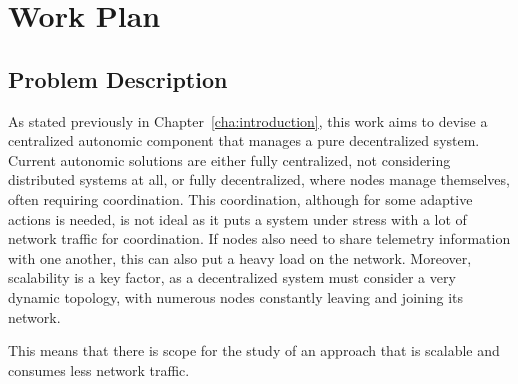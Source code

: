 
%

\chapter{Work Plan}
\label{cha:workplan}


\epigraphfontsize{\small\itshape}
\setlength\epigraphwidth{12.5cm}
\setlength\epigraphrule{0pt}
%
%
%
\section{Problem Description}
\label{sec:problem_description}
\par As stated previously in Chapter~\ref{cha:introduction}, this work aims to devise a centralized autonomic component that manages a pure decentralized system. Current autonomic solutions are either fully centralized, not considering distributed systems at all, or fully decentralized, where nodes manage themselves, often requiring coordination. This coordination, although for some adaptive actions is needed, is not ideal as it puts a system under stress with a lot of network traffic for coordination. If nodes also need to share telemetry information with one another, this can also put a heavy load on the network. Moreover, scalability is a key factor, as a decentralized system must consider a very dynamic topology, with numerous nodes constantly leaving and joining its network.
\par This means that there is scope for the study of an approach that is scalable and consumes less network traffic.%

%
%
%
